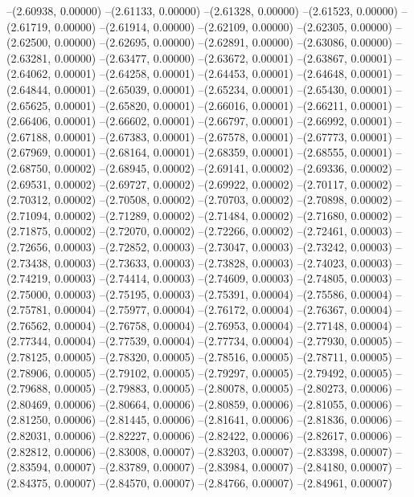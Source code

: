 --(2.60938, 0.00000)
--(2.61133, 0.00000)
--(2.61328, 0.00000)
--(2.61523, 0.00000)
--(2.61719, 0.00000)
--(2.61914, 0.00000)
--(2.62109, 0.00000)
--(2.62305, 0.00000)
--(2.62500, 0.00000)
--(2.62695, 0.00000)
--(2.62891, 0.00000)
--(2.63086, 0.00000)
--(2.63281, 0.00000)
--(2.63477, 0.00000)
--(2.63672, 0.00001)
--(2.63867, 0.00001)
--(2.64062, 0.00001)
--(2.64258, 0.00001)
--(2.64453, 0.00001)
--(2.64648, 0.00001)
--(2.64844, 0.00001)
--(2.65039, 0.00001)
--(2.65234, 0.00001)
--(2.65430, 0.00001)
--(2.65625, 0.00001)
--(2.65820, 0.00001)
--(2.66016, 0.00001)
--(2.66211, 0.00001)
--(2.66406, 0.00001)
--(2.66602, 0.00001)
--(2.66797, 0.00001)
--(2.66992, 0.00001)
--(2.67188, 0.00001)
--(2.67383, 0.00001)
--(2.67578, 0.00001)
--(2.67773, 0.00001)
--(2.67969, 0.00001)
--(2.68164, 0.00001)
--(2.68359, 0.00001)
--(2.68555, 0.00001)
--(2.68750, 0.00002)
--(2.68945, 0.00002)
--(2.69141, 0.00002)
--(2.69336, 0.00002)
--(2.69531, 0.00002)
--(2.69727, 0.00002)
--(2.69922, 0.00002)
--(2.70117, 0.00002)
--(2.70312, 0.00002)
--(2.70508, 0.00002)
--(2.70703, 0.00002)
--(2.70898, 0.00002)
--(2.71094, 0.00002)
--(2.71289, 0.00002)
--(2.71484, 0.00002)
--(2.71680, 0.00002)
--(2.71875, 0.00002)
--(2.72070, 0.00002)
--(2.72266, 0.00002)
--(2.72461, 0.00003)
--(2.72656, 0.00003)
--(2.72852, 0.00003)
--(2.73047, 0.00003)
--(2.73242, 0.00003)
--(2.73438, 0.00003)
--(2.73633, 0.00003)
--(2.73828, 0.00003)
--(2.74023, 0.00003)
--(2.74219, 0.00003)
--(2.74414, 0.00003)
--(2.74609, 0.00003)
--(2.74805, 0.00003)
--(2.75000, 0.00003)
--(2.75195, 0.00003)
--(2.75391, 0.00004)
--(2.75586, 0.00004)
--(2.75781, 0.00004)
--(2.75977, 0.00004)
--(2.76172, 0.00004)
--(2.76367, 0.00004)
--(2.76562, 0.00004)
--(2.76758, 0.00004)
--(2.76953, 0.00004)
--(2.77148, 0.00004)
--(2.77344, 0.00004)
--(2.77539, 0.00004)
--(2.77734, 0.00004)
--(2.77930, 0.00005)
--(2.78125, 0.00005)
--(2.78320, 0.00005)
--(2.78516, 0.00005)
--(2.78711, 0.00005)
--(2.78906, 0.00005)
--(2.79102, 0.00005)
--(2.79297, 0.00005)
--(2.79492, 0.00005)
--(2.79688, 0.00005)
--(2.79883, 0.00005)
--(2.80078, 0.00005)
--(2.80273, 0.00006)
--(2.80469, 0.00006)
--(2.80664, 0.00006)
--(2.80859, 0.00006)
--(2.81055, 0.00006)
--(2.81250, 0.00006)
--(2.81445, 0.00006)
--(2.81641, 0.00006)
--(2.81836, 0.00006)
--(2.82031, 0.00006)
--(2.82227, 0.00006)
--(2.82422, 0.00006)
--(2.82617, 0.00006)
--(2.82812, 0.00006)
--(2.83008, 0.00007)
--(2.83203, 0.00007)
--(2.83398, 0.00007)
--(2.83594, 0.00007)
--(2.83789, 0.00007)
--(2.83984, 0.00007)
--(2.84180, 0.00007)
--(2.84375, 0.00007)
--(2.84570, 0.00007)
--(2.84766, 0.00007)
--(2.84961, 0.00007)
